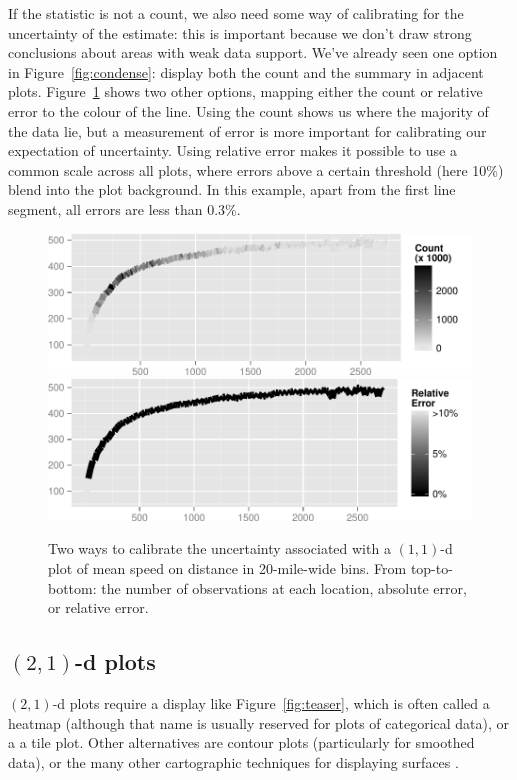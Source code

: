 \documentclass[journal]{vgtc}                %
\begin{document}
If the statistic is not a count, we also need some way of calibrating for the uncertainty of the estimate: this is important because we don't draw strong conclusions about areas with weak data support. We've already seen one option in Figure~\ref{fig:condense}: display both the count and the summary in adjacent plots. Figure~\ref{fig:1d-error} shows two other options, mapping either the count or relative error to the colour of the line. Using the count shows us where the majority of the data lie, but a measurement of error is more important for calibrating our expectation of uncertainty. Using relative error makes it possible to use a common scale across all plots, where errors above a certain threshold (here 10\%) blend into the plot background. In this example, apart from the first line segment, all errors are less than 0.3\%.

\begin{figure}
  \centering
   \includegraphics[width=0.8\linewidth]{1d-count}
   \includegraphics[width=0.8\linewidth]{1d-relerr}
 \caption{Two ways to calibrate the uncertainty associated with a $(1,1)$-d plot of mean speed on distance in 20-mile-wide bins. From top-to-bottom: the number of observations at each location, absolute error, or relative error.}
 \label{fig:1d-error}
\end{figure}

\subsection{\texorpdfstring{$(2,1)$}{(2, 1)}-d plots}
\label{sub:2d-plots}

$(2, 1)$-d plots require a display like Figure~\ref{fig:teaser}, which is often called a heatmap \citep{wilkinson:2009} (although that name is usually reserved for plots of categorical data), or a a tile plot. Other alternatives are contour plots (particularly for smoothed data), or the many other cartographic techniques for displaying surfaces \citep{kennelly:2002}.
\end{document}
